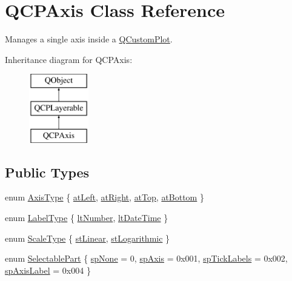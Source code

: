 \hypertarget{classQCPAxis}{\section{Q\-C\-P\-Axis Class Reference}
\label{classQCPAxis}
}


Manages a single axis inside a \hyperlink{classQCustomPlot}{Q\-Custom\-Plot}.  


Inheritance diagram for Q\-C\-P\-Axis\-:\begin{figure}[H]
\begin{center}
\leavevmode
\includegraphics[height=3.000000cm]{classQCPAxis}
\end{center}
\end{figure}
\subsection*{Public Types}
\begin{DoxyCompactItemize}
\item 
enum \hyperlink{classQCPAxis_ae2bcc1728b382f10f064612b368bc18a}{Axis\-Type} \{ \hyperlink{classQCPAxis_ae2bcc1728b382f10f064612b368bc18aaf84aa6cac6fb6099f54a2cbf7546b730}{at\-Left}, 
\hyperlink{classQCPAxis_ae2bcc1728b382f10f064612b368bc18aadf5509f7d29199ef2f263b1dd224b345}{at\-Right}, 
\hyperlink{classQCPAxis_ae2bcc1728b382f10f064612b368bc18aac0ece2b680d3f545e701f75af1655977}{at\-Top}, 
\hyperlink{classQCPAxis_ae2bcc1728b382f10f064612b368bc18aa220d68888516b6c3b493d144f1ba438f}{at\-Bottom}
 \}
\item 
enum \hyperlink{classQCPAxis_a4a7da0166f755f5abac23b765d184cad}{Label\-Type} \{ \hyperlink{classQCPAxis_a4a7da0166f755f5abac23b765d184cada7f1eacf3b73adaefd334bea04e094b7e}{lt\-Number}, 
\hyperlink{classQCPAxis_a4a7da0166f755f5abac23b765d184cadafc70594a9d877124dd11ccc187d4ac52}{lt\-Date\-Time}
 \}
\item 
enum \hyperlink{classQCPAxis_a36d8e8658dbaa179bf2aeb973db2d6f0}{Scale\-Type} \{ \hyperlink{classQCPAxis_a36d8e8658dbaa179bf2aeb973db2d6f0aff6e30a11a828bc850caffab0ff994f6}{st\-Linear}, 
\hyperlink{classQCPAxis_a36d8e8658dbaa179bf2aeb973db2d6f0abf5b785ad976618816dc6f79b73216d4}{st\-Logarithmic}
 \}
\item 
enum \hyperlink{classQCPAxis_abee4c7a54c468b1385dfce2c898b115f}{Selectable\-Part} \{ \hyperlink{classQCPAxis_abee4c7a54c468b1385dfce2c898b115fae0df8123a5528d5ccf87cb7794f971ea}{sp\-None} = 0, 
\hyperlink{classQCPAxis_abee4c7a54c468b1385dfce2c898b115fa8949d2c1a31eccae9be7ed32e7a1ae38}{sp\-Axis} = 0x001, 
\hyperlink{classQCPAxis_abee4c7a54c468b1385dfce2c898b115fa584e0a3dc4d064880647619f4bd4e771}{sp\-Tick\-Labels} = 0x002, 
\hyperlink{classQCPAxis_abee4c7a54c468b1385dfce2c898b115fa851e0600e0d08b4f5fee9361e3fedabd}{sp\-Axis\-Label} = 0x004
 \}
\end{DoxyCompactItemize}
